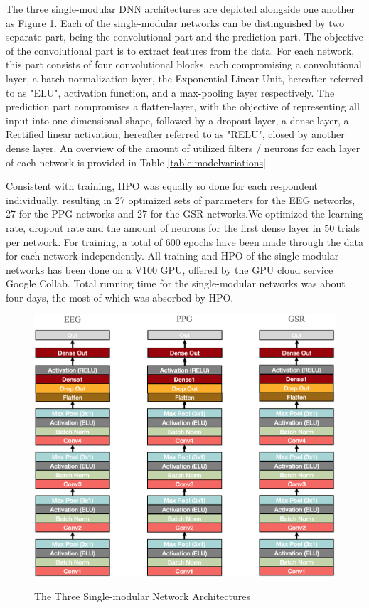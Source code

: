 \documentclass[12pt]{article}
\begin{document}
The three single-modular DNN architectures are depicted alongside one another as Figure \ref{fig:singlearchitecture}. Each of the single-modular networks can be distinguished by two separate part, being the convolutional part and the prediction part.  The objective of the convolutional part is to extract features from the data. For each network, this part consists of four convolutional blocks, each compromising a convolutional layer, a batch normalization layer, the Exponential Linear Unit, hereafter referred to as "ELU", activation function, and a max-pooling layer respectively. The prediction part compromises a flatten-layer,  with the objective of representing all input into one dimensional shape, followed by a dropout layer, a dense layer, a Rectified linear activation, hereafter referred to as "RELU", closed by another dense layer. An overview of the amount of utilized filters / neurons for each layer of each network is provided in Table \ref{table:modelvariations}. 

Consistent with training, HPO was equally so done for each respondent individually, resulting in 27 optimized sets of parameters for the EEG networks, 27 for the PPG networks and 27 for the GSR networks.We optimized the learning rate, dropout rate and the amount of neurons for the first dense layer in 50 trials per network.  For training, a total of 600 epochs have been made through the data for each network independently. All training and HPO of the single-modular networks has been done on a V100 GPU,  offered by the GPU cloud service Google Collab.  Total running time for the single-modular networks was about four days, the most of which was absorbed by HPO. 

\begin{figure}
\caption{The Three Single-modular Network Architectures}
\bigskip
\includegraphics[scale=0.7]{single_model_architecture}
\label{fig:singlearchitecture}
\end{figure}
\restoregeometry
\end{document}
